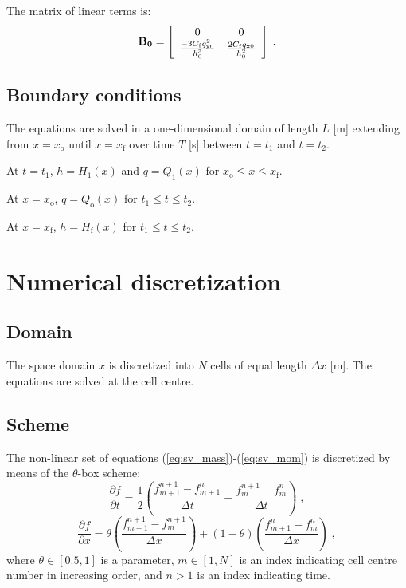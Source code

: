 \documentclass{deltares_manual}
\newcommand{\mathsub}[2]{#1_{\mathrm{#2}}}
\begin{document}
The matrix of linear terms is:
\begin{equation}
\label{eq:B}
\makebox[\textwidth][c]{$
		\mathbf{B_0}=\left[
		\begin{array}{cc}
  0 & 0 \\
	\frac{-3C_{\mathrm{f}}q_{\mathrm{x}0}^2}{h_0^3} & \frac{2C_{\mathrm{f}}q_{\mathrm{x}0}}{h_0^2} \\
 \end{array}\right] \;.
$}
\end{equation}

\subsection{Boundary conditions}

The equations are solved in a one-dimensional domain of length $L$ [\si{m}] extending from $x=\mathsub{x}{o}$ until $x=\mathsub{x}{f}$ over time $T$ [\si{s}] between $t=\mathsub{t}{1}$ and $t=\mathsub{t}{2}$.

At $t=\mathsub{t}{1}$, $h=\mathsub{H}{1}(x)$ and $q=\mathsub{Q}{1}(x)$ for $\mathsub{x}{o}\leq x \leq\mathsub{x}{f}$.

At $x=\mathsub{x}{o}$, $q=\mathsub{Q}{o}(x)$ for $\mathsub{t}{1}\leq t \leq\mathsub{t}{2}$.

At $x=\mathsub{x}{f}$, $h=\mathsub{H}{f}(x)$ for $\mathsub{t}{1}\leq t \leq\mathsub{t}{2}$.

\section{Numerical discretization}

\subsection{Domain}

The space domain $x$ is discretized into $N$ cells of equal length $\Delta x$ [\si{m}]. The equations are solved at the cell centre. 

\subsection{Scheme}

The non-linear set of equations (\ref{eq:sv_mass})-(\ref{eq:sv_mom}) is discretized by means of the $\theta$-box scheme:
\begin{equation}
\frac{\partial f}{\partial t}=\frac{1}{2}\left(\frac{f_{m+1}^{n+1}-f_{m+1}^{n}}{\Delta t}+\frac{f_{m}^{n+1}-f_{m}^{n}}{\Delta t}\right) \;,
\end{equation}
\begin{equation}
\frac{\partial f}{\partial x}=\theta\left(\frac{f_{m+1}^{n+1}-f_{m}^{n+1}}{\Delta x}\right)+\left(1-\theta\right)\left(\frac{f_{m+1}^{n}-f_{m}^{n}}{\Delta x}\right) \;,
\end{equation}
where $\theta\in[0.5,1]$ is a parameter, $m\in[1,N]$ is an index indicating cell centre number in increasing order, and $n>1$ is an index indicating time. 
\end{document}
